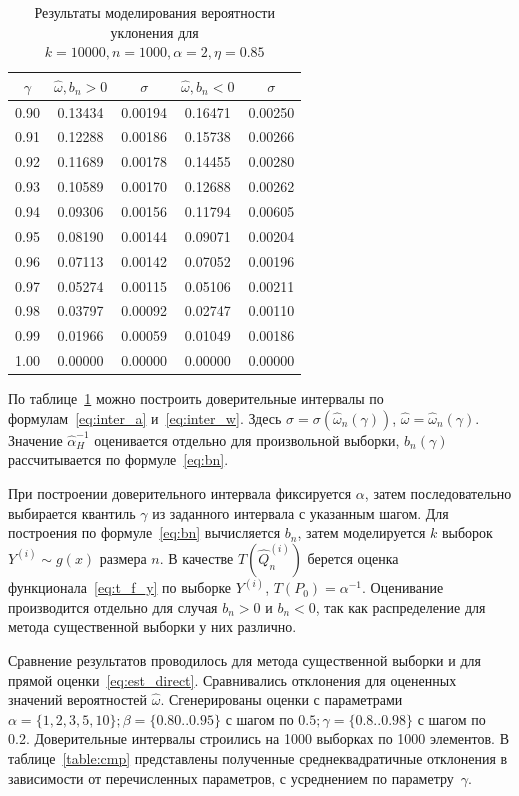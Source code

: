 \documentclass[12pt, specialist, subf, substylefile = spbu.rtx]{disser}
\begin{document}
\begin{table}[ht]
\caption{Результаты моделирования вероятности уклонения для $k=10000, n=1000, \alpha=2, \eta=0.85$} 
\label{table:imp}
\centering
\begin{tabular}{c|cc|cc}
  \hline
$\gamma$ & $\hat{\omega}, b_n > 0$ & $\sigma$ & $\hat{\omega}, b_n < 0$ & $\sigma$ \\ 
  \hline
0.90 & 0.13434 & 0.00194 & 0.16471 & 0.00250 \\ 
0.91 & 0.12288 & 0.00186 & 0.15738 & 0.00266 \\ 
0.92 & 0.11689 & 0.00178 & 0.14455 & 0.00280 \\ 
0.93 & 0.10589 & 0.00170 & 0.12688 & 0.00262 \\ 
0.94 & 0.09306 & 0.00156 & 0.11794 & 0.00605 \\ 
0.95 & 0.08190 & 0.00144 & 0.09071 & 0.00204 \\ 
0.96 & 0.07113 & 0.00142 & 0.07052 & 0.00196 \\ 
0.97 & 0.05274 & 0.00115 & 0.05106 & 0.00211 \\ 
0.98 & 0.03797 & 0.00092 & 0.02747 & 0.00110 \\ 
0.99 & 0.01966 & 0.00059 & 0.01049 & 0.00186 \\ 
1.00 & 0.00000 & 0.00000 & 0.00000 & 0.00000 \\  
   \hline
\end{tabular}
\end{table}

По таблице~\ref{table:imp} можно построить доверительные интервалы по формулам~\eqref{eq:inter_a} и~\eqref{eq:inter_w}. Здесь $\sigma=\sigma(\hat{\omega}_n(\gamma))$, $\hat{\omega}=\hat{\omega}_n(\gamma)$. Значение $\hat{\alpha}_H^{-1}$ оценивается отдельно для произвольной выборки, $b_n(\gamma)$ рассчитывается по формуле~\eqref{eq:bn}.

При построении доверительного интервала фиксируется $\alpha$, затем последовательно выбирается квантиль $\gamma$ из заданного интервала с указанным шагом. Для построения по формуле~\eqref{eq:bn} вычисляется $b_n$, затем моделируется $k$ выборок $Y^{(i)} \sim g(x)$ размера $n$. В качестве $T(\hat{Q}^{(i)}_n)$ берется оценка функционала~\eqref{eq:t_f_y} по выборке $Y^{(i)}$, $T(P_0)=\alpha^{-1}$. Оценивание производится отдельно для случая $b_n > 0$ и $b_n < 0$, так как распределение для метода существенной выборки у них различно.



Сравнение результатов проводилось для метода существенной выборки и для прямой оценки~\eqref{eq:est_direct}. Сравнивались отклонения для оцененных значений вероятностей $\hat{\omega}$. Сгенерированы оценки с параметрами $\alpha = \{1,2,3,5,10\}; \beta=\{0.80..0.95\}$ с шагом по $0.5; \gamma=\{0.8..0.98\}$ с шагом по 0.2. Доверительные интервалы строились на 1000 выборках по 1000 элементов. В таблице~\ref{table:cmp} представлены полученные среднеквадратичные отклонения в зависимости от перечисленных параметров, с усреднением по параметру~$\gamma$.
\end{document}
